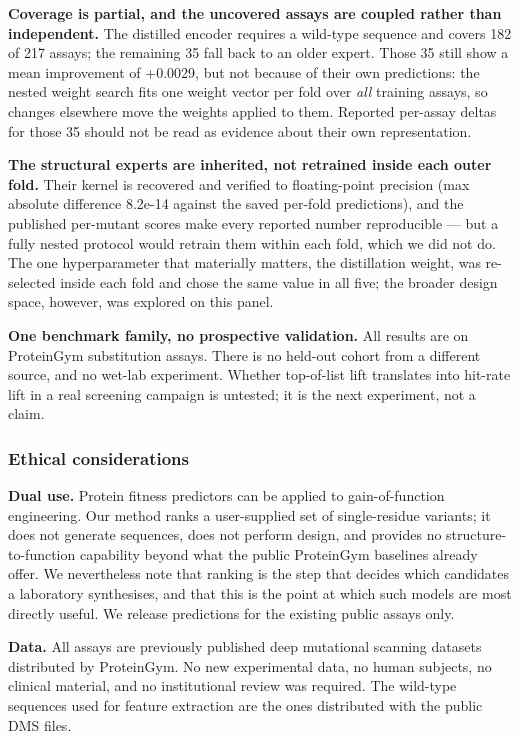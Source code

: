 \documentclass[sigconf,review,nonacm]{acmart}
\begin{document}
\textbf{Coverage is partial, and the uncovered assays are coupled rather than independent.} The distilled
encoder requires a wild-type sequence and covers 182 of 217 assays; the remaining 35 fall back to an
older expert. Those 35 still show a mean improvement of +0.0029, but not because of their own
predictions: the nested weight search fits one weight vector per fold over \emph{all} training assays, so
changes elsewhere move the weights applied to them. Reported per-assay deltas for those 35 should not
be read as evidence about their own representation.

\textbf{The structural experts are inherited, not retrained inside each outer fold.} Their kernel is
recovered and verified to floating-point precision (max absolute difference 8.2e-14 against the saved
per-fold predictions), and the published per-mutant scores make every reported number reproducible ---
but a fully nested protocol would retrain them within each fold, which we did not do. The one
hyperparameter that materially matters, the distillation weight, was re-selected inside each fold and
chose the same value in all five; the broader design space, however, was explored on this panel.

\textbf{One benchmark family, no prospective validation.} All results are on ProteinGym substitution
assays. There is no held-out cohort from a different source, and no wet-lab experiment. Whether
top-of-list lift translates into hit-rate lift in a real screening campaign is untested; it is the
next experiment, not a claim.

\subsubsection*{Ethical considerations}\label{ethical-considerations}

\textbf{Dual use.} Protein fitness predictors can be applied to gain-of-function engineering. Our method
ranks a user-supplied set of single-residue variants; it does not generate sequences, does not perform
design, and provides no structure-to-function capability beyond what the public ProteinGym baselines
already offer. We nevertheless note that ranking is the step that decides which candidates a laboratory
synthesises, and that this is the point at which such models are most directly useful. We release
predictions for the existing public assays only.

\textbf{Data.} All assays are previously published deep mutational scanning datasets distributed by
ProteinGym. No new experimental data, no human subjects, no clinical material, and no institutional
review was required. The wild-type sequences used for feature extraction are the ones distributed with
the public DMS files.
\end{document}
